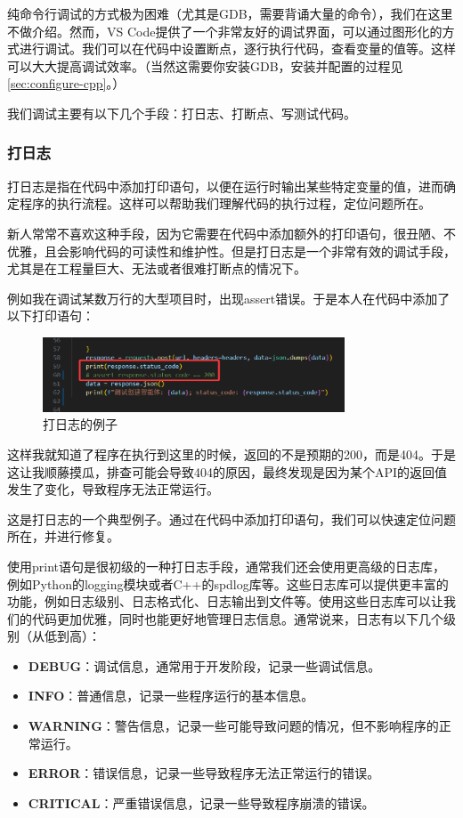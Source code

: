 \documentclass[../main.tex]{subfiles}
\begin{document}
纯命令行调试的方式极为困难（尤其是GDB，需要背诵大量的命令），我们在这里不做介绍。然而，VS Code提供了一个非常友好的调试界面，可以通过图形化的方式进行调试。我们可以在代码中设置断点，逐行执行代码，查看变量的值等。这样可以大大提高调试效率。（当然这需要你安装GDB，安装并配置的过程见\ref{sec:configure-cpp}。）

我们调试主要有以下几个手段：打日志、打断点、写测试代码。

\subsubsection{打日志}

打日志是指在代码中添加打印语句，以便在运行时输出某些特定变量的值，进而确定程序的执行流程。这样可以帮助我们理解代码的执行过程，定位问题所在。

新人常常不喜欢这种手段，因为它需要在代码中添加额外的打印语句，很丑陋、不优雅，且会影响代码的可读性和维护性。但是打日志是一个非常有效的调试手段，尤其是在工程量巨大、无法或者很难打断点的情况下。

例如我在调试某数万行的大型项目时，出现assert错误。于是本人在代码中添加了以下打印语句：

\begin{figure}[htbp]
\centering
\includegraphics[width=0.8\textwidth]{images/printlog.png}
\caption{打日志的例子}
\end{figure}

这样我就知道了程序在执行到这里的时候，返回的不是预期的200，而是404。于是这让我顺藤摸瓜，排查可能会导致404的原因，最终发现是因为某个API的返回值发生了变化，导致程序无法正常运行。

这是打日志的一个典型例子。通过在代码中添加打印语句，我们可以快速定位问题所在，并进行修复。

使用print语句是很初级的一种打日志手段，通常我们还会使用更高级的日志库，例如Python的logging模块或者C++的spdlog库等。这些日志库可以提供更丰富的功能，例如日志级别、日志格式化、日志输出到文件等。使用这些日志库可以让我们的代码更加优雅，同时也能更好地管理日志信息。通常说来，日志有以下几个级别（从低到高）：
\begin{itemize}
  \item \textbf{DEBUG}：调试信息，通常用于开发阶段，记录一些调试信息。
  \item \textbf{INFO}：普通信息，记录一些程序运行的基本信息。
  \item \textbf{WARNING}：警告信息，记录一些可能导致问题的情况，但不影响程序的正常运行。
  \item \textbf{ERROR}：错误信息，记录一些导致程序无法正常运行的错误。
  \item \textbf{CRITICAL}：严重错误信息，记录一些导致程序崩溃的错误。
\end{itemize}
\end{document}
